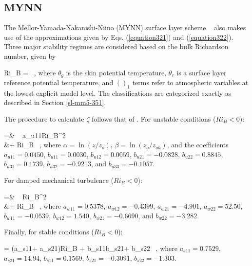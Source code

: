 \subsection{MYNN}
\label{sl-mynn-353}

The Mellor-Yamada-Nakanishi-Niino (MYNN) surface layer scheme ~\citep{NN01, NN04, NN06} also makes use of the  \citet{Dyer} approximations given by Eqs. (\autoref{equation321}) and (\autoref{equation322}). Three major stability regimes are considered based on the bulk Richardson number, given by

\be
Ri_B =  \mbox{ ,} 
\label{equation327}
\ee
\noindent
 where $\theta_g$ is the skin potential temperature, $\theta_r$ is a surface layer reference potential temperature, and $()_1$ terms refer to atmospheric variables at the lowest explicit model level. The classifications are categorized exactly as described in Section \autoref{sl-mm5-351}.

The procedure to calculate $\zeta$ follows that of  \citet{Li2010}. For unstable conditions ($Ri_B < 0$):

\bal
\zeta  =&  \mbox{ } a_{u11}\alpha Ri_B^2 \nonumber \\
&+  Ri_B \mbox{ ,}\label{equation328}
\eal
\noindent
 where $\alpha = \ln(z/z_o)$, $\beta = \ln(z_o/z_{oh})$, and the coefficients $a_{u11} = 0.0450$, $b_{u11} = 0.0030$, $b_{u12} = 0.0059$, $b_{u21} = -0.0828$, $b_{u22} = 0.8845$, $b_{u31} = 0.1739$, $b_{u32} = -0.9213$, and $b_{u33} = -0.1057$. 

For damped mechanical turbulence ($Ri_B < 0$):

\bal
\zeta =& \mbox{ }  Ri_B^2 \nonumber\\ &+  Ri_B  \mbox{ ,}\label{equation329}
\eal
\noindent
 where $a_{w11} = 0.5378$, $a_{w12} = -0.4399$, $a_{w21} = -4.901$, $a_{w22} = 52.50$, $b_{w11} = -0.0539$, $b_{w12} = 1.540$, $b_{w21} = -0.6690$, and $b_{w22} = -3.282$. 

Finally, for stable conditions ($Ri_B < 0$):

\be
\zeta = \left(a_{s11}\alpha + a_{s21}\right)Ri_B + b_{s11}\alpha b_{s21}\beta + b_{s22} \mbox{ ,} \label{equation330}
\ee
\noindent
 where $a_{s11} = 0.7529$, $a_{s21} = 14.94$, $b_{s11} = 0.1569$, $b_{s21} = -0.3091$, $b_{s22} = -1.303$.

